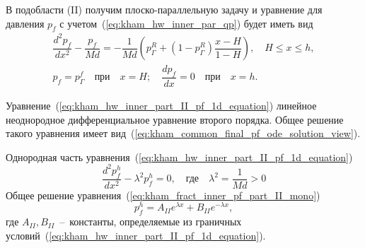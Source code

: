 \documentclass{article}
\newcommand{\mysub}[1]{%
  \par\vspace{0.5em}\noindent{\normalsize\underline{#1}}\par\vspace{0.5em}%
}
\begin{document}
\mysub{Подобласть (II) $H \leq x \leq h$}
В подобласти (II) получим плоско-параллельную задачу и уравнение для давления $p_f$ с
учетом~(\ref{eq:kham_hw_inner_par_qp}) будет иметь вид
\begin{equation}
	\displaystyle
	\begin{gathered}
		\dfrac{d^2 p_f}{dx^2}-\dfrac{p_f}{Md}=-\dfrac{1}{Md}\left(p^R_{\Gamma} + (1 - p^R_{\Gamma})\dfrac{x - H}{1-H}\right),
		\quad H \leq x \leq h, \\
		p_f = p^f_{\Gamma}  \quad \text{при} \quad x = H; \quad \dfrac{d p_f}{d x} = 0 \quad \text{при} \quad x = h.
	\end{gathered}
	\label{eq:kham_hw_inner_part_II_pf_1d_equation}
\end{equation}

Уравнение~(\ref{eq:kham_hw_inner_part_II_pf_1d_equation}) линейное неоднородное дифференциальное уравнение второго порядка.
Общее решение такого уравнения имеет вид~(\ref{eq:kham_common_final_pf_ode_solution_view}).

Однородная часть уравнения~(\ref{eq:kham_hw_inner_part_II_pf_1d_equation})
\begin{equation}
	\displaystyle
	\dfrac{d^2 p_f^h}{dx^2}-\lambda^2 p_f^h = 0, \quad \text{где} \quad \lambda^2 = \dfrac{1}{Md} > 0
	\label{eq:kham_fract_inner_pf_part_II_mono}
\end{equation}
Общее решение уравнения~(\ref{eq:kham_fract_inner_pf_part_II_mono})
\begin{equation}
	\displaystyle
	p_f^h = A_{II} e^{\lambda x} + B_{II} e^{-\lambda x},
	\label{eq:kham_fract_inner_part_II_pf_mono_solution}
\end{equation}
где $A_{II}, B_{II}$~--~константы, определяемые из граничных условий~(\ref{eq:kham_hw_inner_part_II_pf_1d_equation}).
\end{document}
